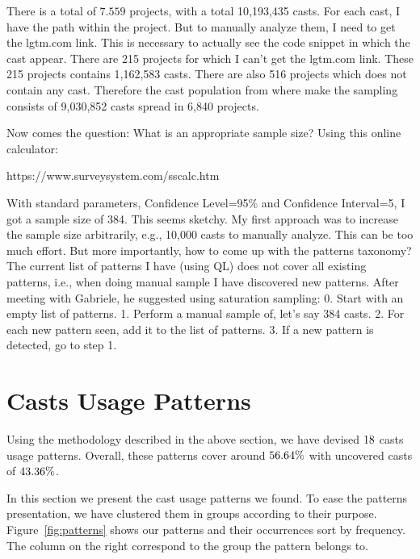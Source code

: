 There is a total of $7.559$ projects, with a total 10,193,435 casts.
For each cast, I have the path within the project.
But to manually analyze them, I need to get the lgtm.com link.
This is necessary to actually see the code snippet in which the cast appear.
There are 215 projects for which I can’t get the lgtm.com link.
These 215 projects contains 1,162,583 casts.
There are also 516 projects which does not contain any cast.
Therefore the cast population from where make the sampling consists of
9,030,852 casts spread in 6,840 projects.

Now comes the question: What is an appropriate sample size?
Using this online calculator:

https://www.surveysystem.com/sscalc.htm

With standard parameters, Confidence Level=95\% and Confidence Interval=5,
I got a sample size of 384.
This seems sketchy.
My first approach was to increase the sample size arbitrarily,
e.g., 10,000 casts to manually analyze.
This can be too much effort.
But more importantly, how to come up with the patterns taxonomy?
The current list of patterns I have (using QL) does not cover all
existing patterns, i.e.,
when doing manual sample I have discovered new patterns.
After meeting with Gabriele, he suggested using saturation sampling:
0. Start with an empty list of patterns.
1. Perform a manual sample of, let’s say 384 casts.
2. For each new pattern seen, add it to the list of patterns.
3. If a new pattern is detected, go to step 1.


\section{Casts Usage Patterns}
\label{sec:patterns}

Using the methodology described in the above section,
we have devised $18{}$ casts usage patterns.
Overall, these patterns cover around 
$56.64\%$
with uncovered casts of
$43.36\%$.

In this section we present the cast usage patterns we found.
To ease the patterns presentation, we have clustered them in groups according to their purpose.
Figure~\ref{fig:patterns} shows our patterns and their occurrences sort by frequency.
The column on the right correspond to the group the pattern belongs to.

